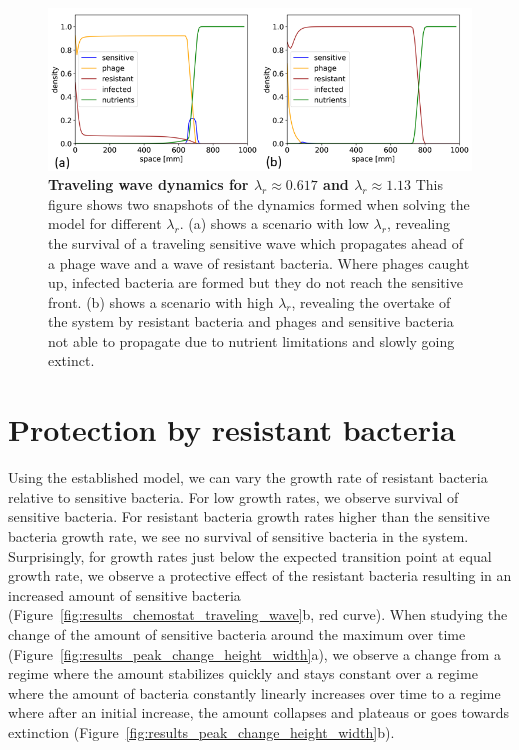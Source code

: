 \begin{figure}
\centering
\includegraphics[width=\linewidth]{graphics/2025_09_29_phages_fig3.png}
\caption{\textbf{Traveling wave dynamics for $\lambda_r \approx 0.617$ and $\lambda_r \approx 1.13$} This figure shows two snapshots of the dynamics formed when solving the model for different $\lambda_r$. (a) shows a scenario with low $\lambda_r$, revealing the survival of a traveling sensitive wave which propagates ahead of a phage wave and a wave of resistant bacteria. Where phages caught up, infected bacteria are formed but they do not reach the sensitive front. (b) shows a scenario with high $\lambda_r$, revealing the overtake of the system by resistant bacteria and phages and sensitive bacteria not able to propagate due to nutrient limitations and slowly going extinct.}
\label{fig:traveling_wave_dynamics}
\end{figure}

\section{Protection by resistant bacteria}
\label{sec:protective_effect}
Using the established model, we can vary the growth rate of resistant bacteria relative to sensitive bacteria. For low growth rates, we observe survival of sensitive bacteria. For resistant bacteria growth rates higher than the sensitive bacteria growth rate, we see no survival of sensitive bacteria in the system. Surprisingly, for growth rates just below the expected transition point at equal growth rate, we observe a protective effect of the resistant bacteria resulting in an increased amount of sensitive bacteria (Figure~\ref{fig:results_chemostat_traveling_wave}b, red curve). When studying the change of the amount of sensitive bacteria around the maximum over time (Figure~\ref{fig:results_peak_change_height_width}a), we observe a change from a regime where the amount stabilizes quickly and stays constant over a regime where the amount of bacteria constantly linearly increases over time to a regime where after an initial increase, the amount collapses and plateaus or goes towards extinction (Figure~\ref{fig:results_peak_change_height_width}b).

